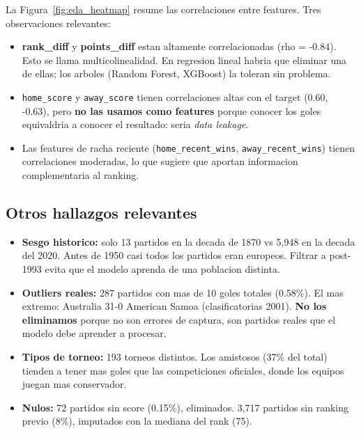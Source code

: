 \documentclass[10pt,twocolumn]{article}
\begin{document}
La Figura~\ref{fig:eda_heatmap} resume las correlaciones entre features. Tres observaciones relevantes:

\begin{itemize}[leftmargin=*,topsep=2pt,itemsep=1pt]
  \item \textbf{rank\_diff} y \textbf{points\_diff} estan altamente correlacionadas (rho = -0.84). Esto se llama multicolinealidad. En regresion lineal habria que eliminar una de ellas; los arboles (Random Forest, XGBoost) la toleran sin problema.
  \item \texttt{home\_score} y \texttt{away\_score} tienen correlaciones altas con el target (0.60, -0.63), pero \textbf{no las usamos como features} porque conocer los goles equivaldria a conocer el resultado: seria \textit{data leakage}.
  \item Las features de racha reciente (\texttt{home\_recent\_wins}, \texttt{away\_recent\_wins}) tienen correlaciones moderadas, lo que sugiere que aportan informacion complementaria al ranking.
\end{itemize}

\subsection{Otros hallazgos relevantes}

\begin{itemize}[leftmargin=*,topsep=2pt,itemsep=1pt]
  \item \textbf{Sesgo historico:} solo 13 partidos en la decada de 1870 vs 5,948 en la decada del 2020. Antes de 1950 casi todos los partidos eran europeos. Filtrar a post-1993 evita que el modelo aprenda de una poblacion distinta.
  \item \textbf{Outliers reales:} 287 partidos con mas de 10 goles totales (0.58\%). El mas extremo: Australia 31-0 American Samoa (clasificatorias 2001). \textbf{No los eliminamos} porque no son errores de captura, son partidos reales que el modelo debe aprender a procesar.
  \item \textbf{Tipos de torneo:} 193 torneos distintos. Los amistosos (37\% del total) tienden a tener mas goles que las competiciones oficiales, donde los equipos juegan mas conservador.
  \item \textbf{Nulos:} 72 partidos sin score (0.15\%), eliminados. 3,717 partidos sin ranking previo (8\%), imputados con la mediana del rank (75).
\end{itemize}

\end{document}
